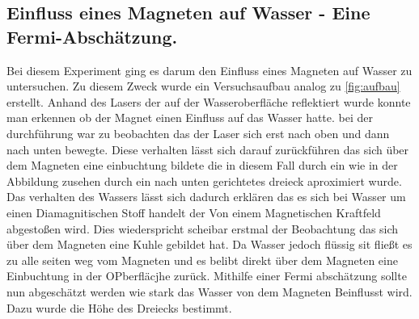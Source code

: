 \subsection{Einfluss eines Magneten auf Wasser - Eine Fermi-Abschätzung. }
Bei diesem Experiment ging es darum den Einfluss eines Magneten auf Wasser zu untersuchen.
Zu diesem Zweck wurde ein Versuchsaufbau analog zu \cref{fig:aufbau} erstellt. Anhand des Lasers der auf der Wasseroberfläche reflektiert wurde konnte man erkennen ob der Magnet einen Einfluss auf das Wasser hatte. bei der durchführung war zu beobachten das der Laser sich erst nach oben und dann nach unten bewegte. Diese verhalten lässt sich darauf zurückführen das sich über dem Magneten eine einbuchtung bildete die in diesem Fall durch ein wie in der Abbildung zusehen durch ein nach unten gerichtetes dreieck aproximiert wurde. Das verhalten des Wassers lässt sich dadurch erklären das es sich bei Wasser um einen Diamagnitischen Stoff handelt der Von einem Magnetischen Kraftfeld abgestoßen wird. Dies wiederspricht scheibar erstmal der Beobachtung das sich über dem Magneten eine Kuhle gebildet hat. Da Wasser jedoch flüssig sit fließt es zu alle seiten weg vom Magneten und es belibt direkt über dem Magneten eine Einbuchtung in der OPberfläcjhe zurück.
Mithilfe einer Fermi abschätzung sollte nun abgeschätzt werden wie stark das Wasser von dem Magneten Beinflusst wird. Dazu wurde die Höhe des Dreiecks bestimmt.